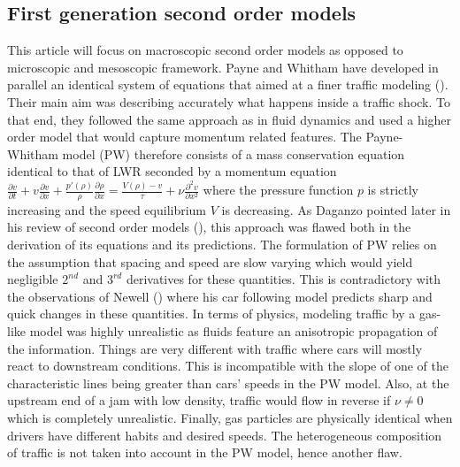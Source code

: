 \documentclass[preprint]{elsarticle}
\begin{document}
\subsection{First generation second order models}
This article will focus on macroscopic second order models as opposed
to microscopic and mesoscopic framework. Payne and Whitham have developed
in parallel an identical system of equations that aimed at a finer
traffic modeling (\cite{payne1971models,whitham1974linear}). Their
main aim was describing accurately what happens inside a traffic shock.
To that end, they followed the same approach as in fluid dynamics
and used a higher order model that would capture momentum related
features. The Payne-Whitham model (PW) therefore consists of a mass
conservation equation identical to that of LWR seconded by a momentum
equation $\frac{\partial v}{\partial t}+v\frac{\partial v}{\partial x}+\frac{p'\left(\rho\right)}{\rho}\frac{\partial\rho}{\partial x}=\frac{V\left(\rho\right)-v}{\tau}+\nu\frac{\partial^{2}v}{\partial x^{2}}$
where the pressure function $p$ is strictly increasing and the speed
equilibrium $V$ is decreasing. As Daganzo pointed later in his review
of second order models (\cite{Dag_requiem}), this approach was flawed
both in the derivation of its equations and its predictions. The formulation
of PW relies on the assumption that spacing and speed are slow varying
which would yield negligible $2^{nd}$ and $3^{rd}$ derivatives for
these quantities. This is contradictory with the observations of Newell
(\cite{Newel}) where his car following model predicts sharp and quick
changes in these quantities. In terms of physics, modeling traffic
by a gas-like model was highly unrealistic as fluids feature an anisotropic
propagation of the information. Things are very different with traffic
where cars will mostly react to downstream conditions. This is incompatible
with the slope of one of the characteristic lines being greater than
cars' speeds in the PW model. Also, at the upstream end of a jam with
low density, traffic would flow in reverse if $\nu\neq0$ which is
completely unrealistic. Finally, gas particles are physically identical
when drivers have different habits and desired speeds. The heterogeneous
composition of traffic is not taken into account in the PW model,
hence another flaw.
\end{document}
